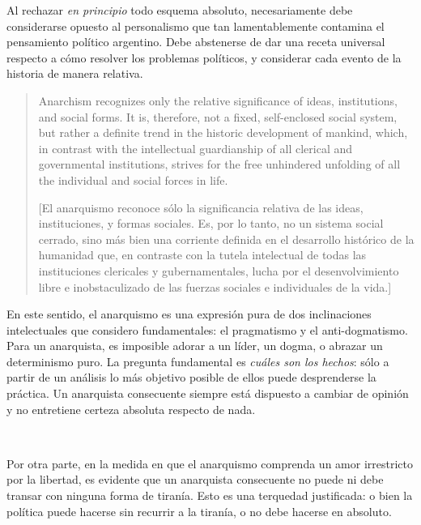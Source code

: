 \documentclass[a4paper, 12pt]{article}
\begin{document}
Al rechazar \textit{en principio} todo esquema absoluto, necesariamente debe
considerarse opuesto al personalismo que tan lamentablemente contamina el
pensamiento político argentino. Debe abstenerse de dar una receta universal
respecto a cómo resolver los problemas políticos, y considerar cada evento de la
historia de manera relativa. 

\begin{quote}
Anarchism recognizes only the relative significance of
ideas, institutions, and social forms. It is, therefore,
not a fixed, self-enclosed social system, but rather a
definite trend in the historic development of mankind,
which, in contrast with the intellectual guardianship of
all clerical and governmental institutions, strives for the
free unhindered unfolding of all the individual and social
forces in life. 

[El anarquismo reconoce sólo la significancia relativa de las ideas,
instituciones, y formas sociales. Es, por lo tanto, no un sistema social 
cerrado, sino más bien una corriente definida en el desarrollo histórico de 
la humanidad que, en contraste con la tutela intelectual de todas las
instituciones clericales y gubernamentales, lucha por el desenvolvimiento 
libre e inobstaculizado de las fuerzas sociales e individuales de la vida.]
\end{quote}

En este sentido, el anarquismo es una expresión pura de dos inclinaciones
intelectuales que considero fundamentales: el pragmatismo y el anti-dogmatismo.
Para un anarquista, es imposible adorar a un líder, un dogma, o abrazar un
determinismo puro. La pregunta fundamental es \textit{cuáles son los hechos}:
sólo a partir de un análisis lo más objetivo posible de ellos puede desprenderse
la práctica. Un anarquista consecuente siempre está dispuesto a cambiar de
opinión y no entretiene certeza absoluta respecto de nada.

~

Por otra parte, en la medida en que el anarquismo comprenda un amor irrestricto
por la libertad, es evidente que un anarquista consecuente no puede ni debe
transar con ninguna forma de tiranía. Esto es una terquedad justificada: o bien
la política puede hacerse sin recurrir a la tiranía, o no debe hacerse en
absoluto. 

~
\end{document}
